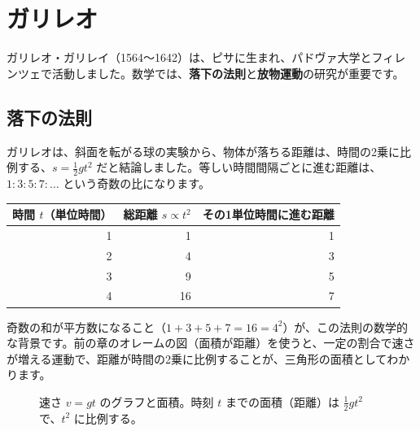 \documentclass[a4paper,11pt,openany]{ltjsbook}
\begin{document}
\section{ガリレオ}

ガリレオ・ガリレイ（1564〜1642）は、ピサに生まれ、パドヴァ大学とフィレンツェで活動しました。数学では、\textbf{落下の法則}と\textbf{放物運動}の研究が重要です。

\subsection{落下の法則}

ガリレオは、斜面を転がる球の実験から、物体が落ちる距離は、時間の2乗に比例する、$s=\tfrac12 g t^2$ だと結論しました。等しい時間間隔ごとに進む距離は、$1:3:5:7:\ldots$ という奇数の比になります。

\begin{center}
\begin{tabular}{rrr}
\toprule
時間 $t$（単位時間） & 総距離 $s\propto t^2$ & その1単位時間に進む距離\\
\midrule
1 & 1 & 1\\
2 & 4 & 3\\
3 & 9 & 5\\
4 & 16 & 7\\
\bottomrule
\end{tabular}
\end{center}

奇数の和が平方数になること（$1+3+5+7=16=4^2$）が、この法則の数学的な背景です。前の章のオレームの図（面積が距離）を使うと、一定の割合で速さが増える運動で、距離が時間の2乗に比例することが、三角形の面積としてわかります。

\begin{figure}[htbp]
\centering
{}
\caption{速さ $v=gt$ のグラフと面積。時刻 $t$ までの面積（距離）は $\tfrac12 gt^2$ で、$t^2$ に比例する。}
\end{figure}
\end{document}
